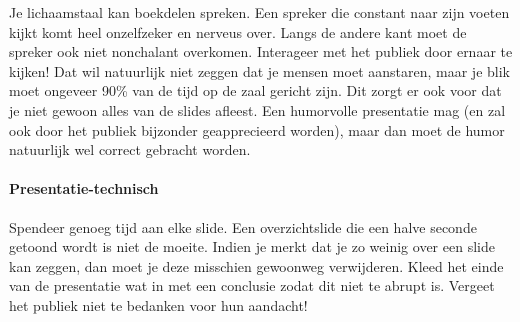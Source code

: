 \documentclass[a4paper]{article}
\begin{document}
Je lichaamstaal kan boekdelen spreken.
Een spreker die constant naar zijn voeten kijkt komt heel onzelfzeker en nerveus over.
Langs de andere kant moet de spreker ook niet nonchalant overkomen.
Interageer met het publiek door ernaar te kijken! Dat wil natuurlijk niet zeggen dat je mensen moet aanstaren, maar je blik moet ongeveer 90\% van de tijd op de zaal gericht zijn.
Dit zorgt er ook voor dat je niet gewoon alles van de slides afleest.
Een humorvolle presentatie mag (en zal ook door het publiek bijzonder geapprecieerd worden), maar dan moet de humor natuurlijk wel correct gebracht worden.


\paragraph{Presentatie-technisch}

Spendeer genoeg tijd aan elke slide.
Een overzichtslide die een halve seconde getoond wordt is niet de moeite.
Indien je merkt dat je zo weinig over een slide kan zeggen, dan moet je deze misschien gewoonweg verwijderen.
Kleed het einde van de presentatie wat in met een conclusie zodat dit niet te abrupt is.
Vergeet het publiek niet te bedanken voor hun aandacht!



\end{document}
